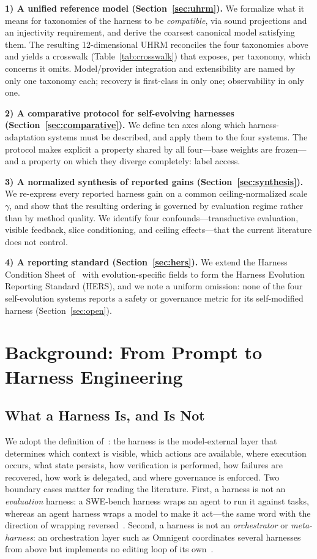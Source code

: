 \documentclass[conference]{IEEEtran}
\begin{document}
\textbf{1) A unified reference model (Section~\ref{sec:uhrm}).} We formalize what it means for taxonomies of the harness to be \emph{compatible}, via sound projections and an injectivity requirement, and derive the coarsest canonical model satisfying them. The resulting 12-dimensional UHRM reconciles the four taxonomies above and yields a crosswalk (Table~\ref{tab:crosswalk}) that exposes, per taxonomy, which concerns it omits. Model/provider integration and extensibility are named by only one taxonomy each; recovery is first-class in only one; observability in only one.

\textbf{2) A comparative protocol for self-evolving harnesses (Section~\ref{sec:comparative}).} We define ten axes along which harness-adaptation systems must be described, and apply them to the four systems. The protocol makes explicit a property shared by all four---base weights are frozen---and a property on which they diverge completely: label access.

\textbf{3) A normalized synthesis of reported gains (Section~\ref{sec:synthesis}).} We re-express every reported harness gain on a common ceiling-normalized scale $\gamma$, and show that the resulting ordering is governed by evaluation regime rather than by method quality. We identify four confounds---transductive evaluation, visible feedback, slice conditioning, and ceiling effects---that the current literature does not control.

\textbf{4) A reporting standard (Section~\ref{sec:hers}).} We extend the Harness Condition Sheet of~\cite{b7} with evolution-specific fields to form the Harness Evolution Reporting Standard (HERS), and we note a uniform omission: none of the four self-evolution systems reports a safety or governance metric for its self-modified harness (Section~\ref{sec:open}).

\section{Background: From Prompt to Harness Engineering}
\label{sec:background}

\subsection{What a Harness Is, and Is Not}

We adopt the definition of~\cite{b7}: the harness is the model-external layer that determines which context is visible, which actions are available, where execution occurs, what state persists, how verification is performed, how failures are recovered, how work is delegated, and where governance is enforced. Two boundary cases matter for reading the literature. First, a harness is not an \emph{evaluation} harness: a SWE-bench harness wraps an agent to run it against tasks, whereas an agent harness wraps a model to make it act---the same word with the direction of wrapping reversed~\cite{b1}. Second, a harness is not an \emph{orchestrator} or \emph{meta-harness}: an orchestration layer such as Omnigent coordinates several harnesses from above but implements no editing loop of its own~\cite{b1}.
\end{document}
